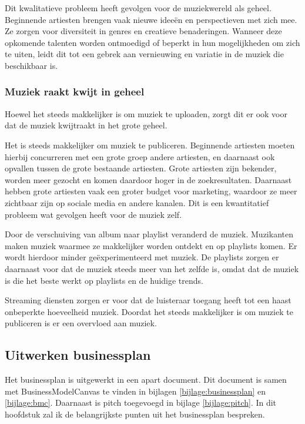 Dit kwalitatieve probleem heeft gevolgen voor de muziekwereld als geheel. Beginnende artiesten brengen vaak nieuwe ideeën en perspectieven met zich mee. Ze zorgen voor diversiteit in genres en creatieve benaderingen. Wanneer deze opkomende talenten worden ontmoedigd of beperkt in hun mogelijkheden om zich te uiten, leidt dit tot een gebrek aan vernieuwing en variatie in de muziek die beschikbaar is.

\subsubsection*{Muziek raakt kwijt in geheel}
\begin{quotebox}
Hoewel het steeds makkelijker is om muziek te uploaden, zorgt dit er ook voor dat de muziek kwijtraakt in het grote geheel.
\end{quotebox}

Het is steeds makkelijker om muziek te publiceren. Beginnende artiesten moeten hierbij concurreren met een grote groep andere artiesten, en daarnaast ook opvallen tussen de grote bestaande artiesten. Grote artiesten zijn bekender, worden meer gezocht en komen daardoor hoger in de zoekresultaten. Daarnaast hebben grote artiesten vaak een groter budget voor marketing, waardoor ze meer zichtbaar zijn op sociale media en andere kanalen. Dit is een kwantitatief probleem wat gevolgen heeft voor de muziek zelf.

Door de verschuiving van album naar playlist veranderd de muziek. Muzikanten maken muziek waarmee ze makkelijker worden ontdekt en op playlists komen. Er wordt hierdoor minder geëxperimenteerd met muziek. De playlists zorgen er daarnaast voor dat de muziek steeds meer van het zelfde is, omdat dat de muziek is die het beste werkt op playlists en de huidige trends.

Streaming diensten zorgen er voor dat de luisteraar toegang heeft tot een haast onbeperkte hoeveelheid muziek. Doordat het steeds makkelijker is om muziek te publiceren is er een overvloed aan muziek. 

\subsection{Uitwerken businessplan}

Het businessplan is uitgewerkt in een apart document. Dit document is samen met BusinessModelCanvas te vinden in bijlagen \ref{bijlage:businessplan} en \ref{bijlage:bmc}. Daarnaast is pitch toegevoegd in bijlage \ref{bijlage:pitch}. In dit hoofdstuk zal ik de belangrijkste punten uit het businessplan bespreken.

